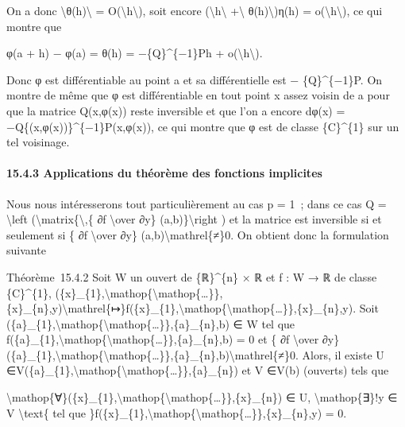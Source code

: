 \documentclass[]{article}
\begin{document}
On a donc \textbackslash{}\textbar{}θ(h)\textbackslash{}\textbar{} =
O(\textbackslash{}\textbar{}h\textbackslash{}\textbar{}), soit encore
(\textbackslash{}\textbar{}h\textbackslash{}\textbar{}
+\textbackslash{}\textbar{} θ(h)\textbackslash{}\textbar{})η(h) =
o(\textbackslash{}\textbar{}h\textbackslash{}\textbar{}), ce qui montre
que

φ(a + h) − φ(a) = θ(h) = −\{Q\}\^{}\{−1\}Ph +
o(\textbackslash{}\textbar{}h\textbackslash{}\textbar{}).

Donc φ est différentiable au point a et sa différentielle est −
\{Q\}\^{}\{−1\}P. On montre de même que φ est différentiable en tout
point x assez voisin de a pour que la matrice Q(x,φ(x)) reste inversible
et que l'on a encore dφ(x) = −Q\{(x,φ(x))\}\^{}\{−1\}P(x,φ(x)), ce qui
montre que φ est de classe \{C\}\^{}\{1\} sur un tel voisinage.

\paragraph{15.4.3 Applications du théorème des fonctions implicites}

Nous nous intéresserons tout particulièrement au cas p = 1~; dans ce cas
Q = \textbackslash{}left (\textbackslash{}matrix\{\textbackslash{},\{ ∂f
\textbackslash{}over ∂y\} (a,b)\}\textbackslash{}right ) et la matrice
est inversible si et seulement si \{ ∂f \textbackslash{}over ∂y\}
(a,b)\textbackslash{}mathrel\{≠\}0. On obtient donc la formulation
suivante

Théorème~15.4.2 Soit W un ouvert de \{ℝ\}\^{}\{n\} × ℝ et f : W → ℝ de
classe \{C\}\^{}\{1\},
(\{x\}\_\{1\},\textbackslash{}mathop\{\textbackslash{}mathop\{\ldots{}\}\},\{x\}\_\{n\},y)\textbackslash{}mathrel\{↦\}f(\{x\}\_\{1\},\textbackslash{}mathop\{\textbackslash{}mathop\{\ldots{}\}\},\{x\}\_\{n\},y).
Soit
(\{a\}\_\{1\},\textbackslash{}mathop\{\textbackslash{}mathop\{\ldots{}\}\},\{a\}\_\{n\},b)
∈ W tel que
f(\{a\}\_\{1\},\textbackslash{}mathop\{\textbackslash{}mathop\{\ldots{}\}\},\{a\}\_\{n\},b)
= 0 et \{ ∂f \textbackslash{}over ∂y\}
(\{a\}\_\{1\},\textbackslash{}mathop\{\textbackslash{}mathop\{\ldots{}\}\},\{a\}\_\{n\},b)\textbackslash{}mathrel\{≠\}0.
Alors, il existe U
∈V(\{a\}\_\{1\},\textbackslash{}mathop\{\textbackslash{}mathop\{\ldots{}\}\},\{a\}\_\{n\})
et V ∈V(b) (ouverts) tels que

\textbackslash{}mathop\{∀\}(\{x\}\_\{1\},\textbackslash{}mathop\{\textbackslash{}mathop\{\ldots{}\}\},\{x\}\_\{n\})
∈ U, \textbackslash{}mathop\{∃\}!y ∈ V \textbackslash{}text\{ tel que
\}f(\{x\}\_\{1\},\textbackslash{}mathop\{\textbackslash{}mathop\{\ldots{}\}\},\{x\}\_\{n\},y)
= 0.
\end{document}

